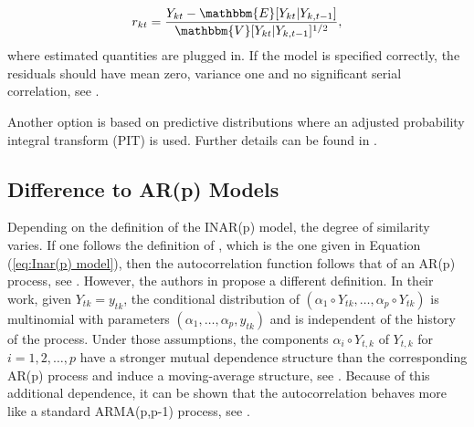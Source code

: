 \begin{equation}
r_{kt} = \frac{Y_{kt}-\mathbbm{E}[Y_{kt}|Y_{k,t-1}]}{\mathbbm{V}[Y_{kt}|Y_{k,t-1}]^{1/2}},
\label{eq:Pearson residuals}
\end{equation}
%
where estimated quantities are plugged in. If the model is specified correctly, the residuals should have mean zero, variance one and no significant serial correlation, see \textcite{Silva:2005}. 

Another option is based on predictive distributions where an adjusted probability integral transform (PIT) is used. Further details can be found in \textcite{Silva:2005}. 

\subsection{Difference to AR(p) Models}
\label{sec: Difference to AR models}


Depending on the definition of the INAR(p) model, the degree of similarity varies. If one follows the definition of \textcite{Guan:1991}, which is the one given in Equation (\ref{eq:Inar(p) model}), then the autocorrelation function follows that of an AR(p) process, see \textcite{Oliveira:2005}. However, the authors in \textcite{Alzaid:1990} propose a different definition. In their work, given $Y_{tk}=y_{tk}$, the conditional distribution of $(\alpha_1 \circ Y_{tk}, \ldots, \alpha_p \circ Y_{tk})$ is multinomial with parameters $( \alpha_1,\ldots,\alpha_p,y_{tk})$ and is independent of the history of the process. Under those assumptions, the components $\alpha_i \circ Y_{t,k}$ of $Y_{t,k}$ for $i=1,2,\ldots,p$  have a stronger mutual dependence structure than the corresponding AR(p) process and induce a moving-average structure, see \textcite{Alzaid:1990}. Because of this additional dependence, it can be shown that the autocorrelation behaves more like a standard ARMA(p,p-1) process, see \textcite{Alzaid:1990}. 
